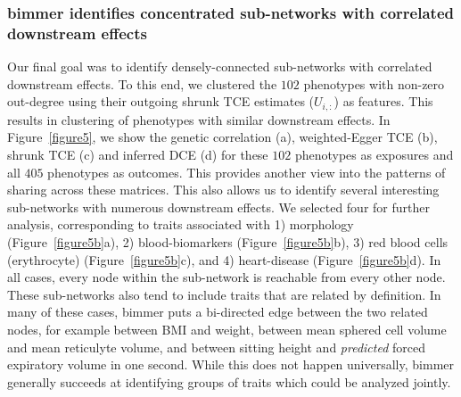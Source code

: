 \documentclass{article}
\begin{document}
\subsubsection*{bimmer identifies concentrated sub-networks with correlated downstream effects}
Our final goal was to identify densely-connected sub-networks with correlated downstream effects.
To this end, we clustered the $102$ phenotypes with non-zero out-degree using their
outgoing shrunk TCE estimates ($U_{i, :}$) as features.
This results in clustering of phenotypes with similar downstream effects.
In Figure~\ref{figure5}, we show the genetic correlation (a), weighted-Egger TCE (b), shrunk TCE (c) and
inferred DCE (d) for these $102$ phenotypes as exposures and all $405$ phenotypes as outcomes.
This provides another view into the patterns of sharing across these matrices.
This also allows us to identify several interesting sub-networks
with numerous downstream effects. We selected four
for further analysis, corresponding to traits associated with 1) morphology (Figure~\ref{figure5b}a),
2) blood-biomarkers (Figure~\ref{figure5b}b), 3) red blood cells (erythrocyte) (Figure~\ref{figure5b}c),
and 4)  heart-disease (Figure~\ref{figure5b}d).
In all cases, every node within the sub-network is reachable from every other node. 
These sub-networks also tend to include traits that are related by definition. In many of these cases,
bimmer puts a bi-directed edge between the two related nodes, for example between BMI and weight,
between mean sphered cell volume and mean reticulyte volume, and between
sitting height and \emph{predicted} forced expiratory volume in one second. While this does not happen universally,
bimmer generally succeeds at identifying groups of traits which could be analyzed jointly. 
\end{document}
